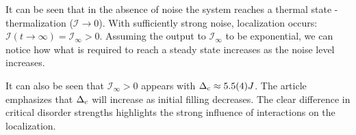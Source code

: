 It can be seen that in the absence of noise the system reaches a thermal state - thermalization ($\mathcal{I} \to 0$). With sufficiently strong noise, localization occurs: $\mathcal{I}(t \to \infty) = \mathcal{I}_\infty > 0$. Assuming the output to $\mathcal{I}_\infty$ to be exponential, we can notice how what is required to reach a steady state increases as the noise level increases.


It can also be seen that $\mathcal{I}_\infty > 0$ appears with $\Delta_{\textnormal{c}} \approx 5.5(4) J$. The article emphasizes that $\Delta_{\textnormal{c}}$ will increase as initial filling decreases. The clear difference in critical disorder strengths highlights the strong influence of interactions on the localization.


